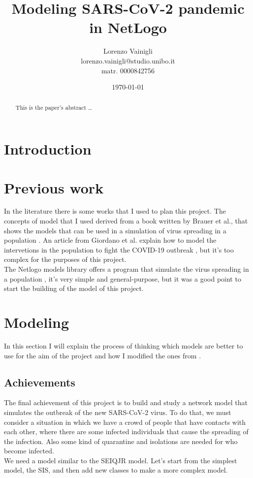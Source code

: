 \documentclass[12pt]{llncs}
\title{Modeling SARS-CoV-2 pandemic in NetLogo}
\author{Lorenzo Vainigli \\
lorenzo.vainigli@studio.unibo.it \\
matr. 0000842756}
\institute{Course of Complex Systems and Network Science \\
Laurea Magistrale in Informatica \\
University of Bologna \\
A.Y. 2020-2021}
\date{\today}
\begin{document}
\maketitle

\begin{abstract}
This is the paper's abstract \ldots
\end{abstract}

\section{Introduction}

\section{Previous work}\label{previous work}
In the literature there is some works that I used to plan this project. The concepts of model that I used derived from a book written by Brauer et al., that shows the models that can be used in a simulation of virus spreading in a population \cite{brauer}. An article from Giordano et al. explain how to model the intervetions in the population to fight the COVID-19 outbreak \cite{giordano}, but it's too complex for the purposes of this project.\\
The Netlogo \cite{netlogo} models library offers a program that simulate the virus spreading in a population \cite{netlogo-virus}, it's very simple and general-purpose, but it was a good point to start the building of the model of this project.

\section{Modeling}
In this section I will explain the process of thinking which models are better to use for the aim of the project and how I modified the ones from \cite{brauer}.

\subsection{Achievements}
The final achievement of this project is to build and study a network model that simulates the outbreak of the new SARS-CoV-2 virus. To do that, we must consider a situation in which we have a crowd of people that have contacts with each other, where there are some infected individuals that cause the spreading of the infection. Also some kind of quarantine and isolations are needed for who become infected. \\
We need a model similar to the SEIQJR model. Let's start from the simplest model, the SIS, and then add new classes to make a more complex model.
\end{document}
